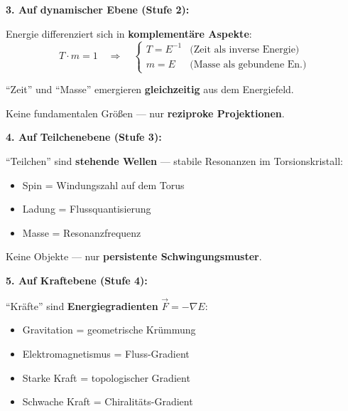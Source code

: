 \begin{revolutionary}
		\textbf{3. Auf dynamischer Ebene (Stufe 2):}
		
		Energie differenziert sich in \textbf{komplementäre Aspekte}:
		\begin{equation}
			T \cdot m = 1 \quad \Rightarrow \quad \begin{cases}
				T = E^{-1} & \text{(Zeit als inverse Energie)} \\
				m = E & \text{(Masse als gebundene En.)}
			\end{cases}
		\end{equation}
		
		\vspace{0.3cm}
		
		\enquote{Zeit} und \enquote{Masse} emergieren \textbf{gleichzeitig} aus dem Energiefeld.
		
		Keine fundamentalen Größen — nur \textbf{reziproke Projektionen}.
		
		\vspace{0.5cm}
		
		\textbf{4. Auf Teilchenebene (Stufe 3):}
		
		\enquote{Teilchen} sind \textbf{stehende Wellen} — stabile Resonanzen im Torsionskristall:
		\begin{itemize}
			\item Spin = Windungszahl auf dem Torus
			\item Ladung = Flussquantisierung
			\item Masse = Resonanzfrequenz
		\end{itemize}
		
		\vspace{0.3cm}
		
		Keine Objekte — nur \textbf{persistente Schwingungsmuster}.
		
		\vspace{0.5cm}
		
		\textbf{5. Auf Kraftebene (Stufe 4):}
		
		\enquote{Kräfte} sind \textbf{Energiegradienten} $\vec{F} = -\nabla E$:
		\begin{itemize}
			\item Gravitation = geometrische Krümmung
			\item Elektromagnetismus = Fluss-Gradient
			\item Starke Kraft = topologischer Gradient
			\item Schwache Kraft = Chiralitäts-Gradient
		\end{itemize}
		
		\vspace{0.3cm}
		

\end{revolutionary}
